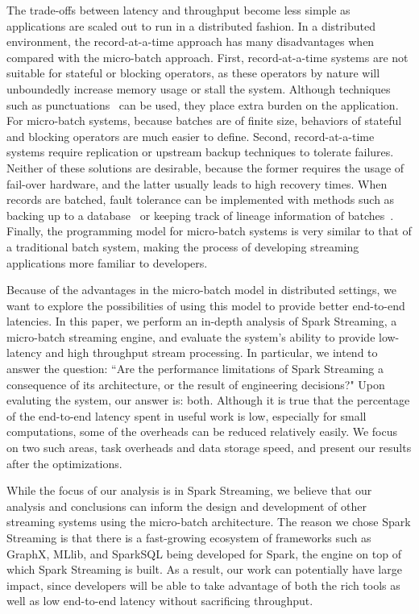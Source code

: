 The trade-offs between latency and throughput become less simple as applications are scaled out to run in a distributed fashion. In a distributed environment, the record-at-a-time approach has many disadvantages when compared with the micro-batch approach.
First, record-at-a-time systems are not suitable for stateful or blocking operators, as these operators by nature will unboundedly increase memory usage or stall the system. Although techniques such as punctuations~\cite{tucker2003exploiting} can be used, they place extra burden on the application. For micro-batch systems, because batches are of finite size, behaviors of stateful and blocking operators are much easier to define.
Second, record-at-a-time systems require replication or upstream backup techniques to tolerate failures. Neither of these solutions are desirable, because the former requires the usage of fail-over hardware, and the latter usually leads to high recovery times. When records are batched, fault tolerance can be implemented with methods such as backing up to a database~\cite{Storm} or keeping track of lineage information of batches~\cite{SparkStreaming}.
Finally, the programming model for micro-batch systems is very similar to that of a traditional batch system, making the process of developing streaming applications more familiar to developers.

Because of the advantages in the micro-batch model in distributed settings, we want to explore the possibilities of using this model to provide better end-to-end latencies. In this paper, we perform an in-depth analysis of Spark Streaming, a micro-batch streaming engine, and evaluate the system's ability to provide low-latency and high throughput stream processing.
In particular, we intend to answer the question: ``Are the performance limitations of Spark Streaming a consequence of its architecture, or the result of engineering decisions?"
Upon evaluting the system, our answer is: both. Although it is true that the percentage of the end-to-end latency spent in useful work is low, especially for small computations, some of the overheads can be reduced relatively easily. We focus on two such areas, task overheads and data storage speed, and present our results after the optimizations.

While the focus of our analysis is in Spark Streaming, we believe that our analysis and conclusions can inform the design and development of other streaming systems using the micro-batch architecture. The reason we chose Spark Streaming is that there is a fast-growing ecosystem of frameworks such as GraphX, MLlib, and SparkSQL being developed for Spark, the engine on top of which Spark Streaming is built. As a result, our work can potentially have large impact, since developers will be able to take advantage of both the rich tools as well as low end-to-end latency without sacrificing throughput.

